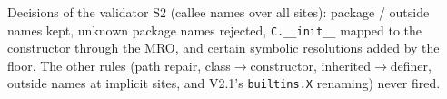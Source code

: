 \begin{table}[t]
  \caption{Decisions of the validator S2 (callee names over all sites): package / outside names kept,
  unknown package names rejected, \texttt{C.\_\_init\_\_} mapped to the constructor through the MRO,
  and certain symbolic resolutions added by the floor. The other rules (path repair, class$\to$constructor,
  inherited$\to$definer, outside names at implicit sites, and V2.1's \texttt{builtins.X} renaming) never fired.}
  \label{tab:validation}
  \small
  \setlength{\tabcolsep}{4pt}
  
\end{table}

